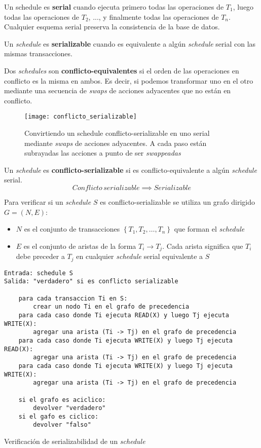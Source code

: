 \documentclass[a4paper, twoside]{article}
\begin{document}
Un schedule es \textbf{serial} cuando ejecuta primero todas las operaciones de $T_{1}$, luego todas las operaciones de $T_{2}$, ..., y finalmente todas las operaciones de $T_{n}$. Cualquier esquema serial preserva la consistencia de la base de datos.

Un \emph{schedule} es \textbf{serializable} cuando es equivalente a algún \emph{schedule} serial con las mismas transacciones.

Dos \emph{schedules} son \textbf{conflicto-equivalentes} si el orden de las operaciones en conflicto es la misma en ambos. Es decir, si podemos transformar uno en el otro mediante una secuencia de \emph{swaps} de acciones adyacentes que no están en conflicto.

\begin{figure}[H]
	\centering
	\texttt{[image: conflicto\_serializable]}
	\caption{Convirtiendo un schedule conflicto-serializable en uno serial mediante \emph{swaps} de acciones adyacentes. A cada paso están subrayadas las acciones a punto de ser \emph{swappeadas}}
\end{figure}

Un \emph{schedule} es \textbf{conflicto-serializable} si es conflicto-equivalente a algún \emph{schedule} serial.
\[
	Conflicto\, serializable \implies Serializable
\]

Para verificar si un \emph{schedule $S$ }es conflicto-serializable se utiliza un grafo dirigido $G=(N,E)$:
\begin{itemize}
	\item $N$ es el conjunto de transacciones $\left\{ T_{1},T_{2},\ldots,T_{n}\right\} $ que forman el \emph{schedule}
	\item $E$ es el conjunto de aristas de la forma $T_{i}\to T_{j}$. Cada arista significa que $T_{i}$ debe preceder a $T_{j}$ en cualquier \emph{schedule} serial equivalente a $S$
\end{itemize}

\begin{algorithm}[H]
	\begin{lstlisting}
Entrada: schedule S
Salida: "verdadero" si es conflicto serializable

	para cada transaccion Ti en S:
		crear un nodo Ti en el grafo de precedencia
	para cada caso donde Ti ejecuta READ(X) y luego Tj ejecuta WRITE(X):
		agregar una arista (Ti -> Tj) en el grafo de precedencia
	para cada caso donde Ti ejecuta WRITE(X) y luego Tj ejecuta READ(X):
		agregar una arista (Ti -> Tj) en el grafo de precedencia
	para cada caso donde Ti ejecuta WRITE(X) y luego Tj ejecuta WRITE(X):
		agregar una arista (Ti -> Tj) en el grafo de precedencia
	
	si el grafo es aciclico:
		devolver "verdadero"
	si el gafo es ciclico:
		devolver "falso"
\end{lstlisting}
\caption{Verificación de serializabilidad de un \emph{schedule}}
\end{algorithm}
\end{document}

